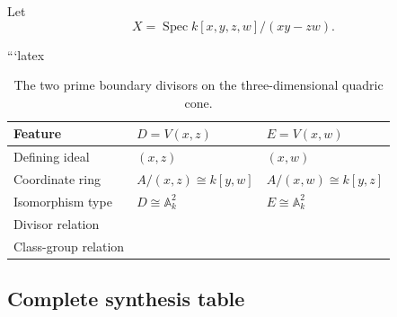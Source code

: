 \documentclass[12pt,a4paper]{article}
\DeclareMathOperator{\Spec}{Spec}
\providecommand{\Spec}{\operatorname{Spec}}
\theoremstyle{notespace}
\begin{document}
		Let
		\[
		X=\Spec k[x,y,z,w]/(xy-zw).
		\]
		
```latex
\begin{table}[htbp]
	\centering
	\renewcommand{\arraystretch}{1.45}
	\setlength{\tabcolsep}{5pt}
	\begin{tabular}{
			|>{\raggedright\arraybackslash}p{3.3cm}
			|>{\centering\arraybackslash}p{5.1cm}
			|>{\centering\arraybackslash}p{5.1cm}|
		}
		\hline
		\textbf{Feature}
		&
		\(\displaystyle D=V(x,z)\)
		&
		\(\displaystyle E=V(x,w)\)
		\\
		\hline
		
		Defining ideal
		&
		\(\displaystyle (x,z)\)
		&
		\(\displaystyle (x,w)\)
		\\
		\hline
		
		Coordinate ring
		&
		\(\displaystyle A/(x,z)\cong k[y,w]\)
		&
		\(\displaystyle A/(x,w)\cong k[y,z]\)
		\\
		\hline
		
		Isomorphism type
		&
		\(\displaystyle D\cong \mathbb{A}^{2}_{k}\)
		&
		\(\displaystyle E\cong \mathbb{A}^{2}_{k}\)
		\\
		\hline
		
		Divisor relation
		&
		\multicolumn{2}{c|}{
			\(\displaystyle \operatorname{div}(x)=D+E\)
		}
		\\
		\hline
		
		Class-group relation
		&
		\multicolumn{2}{c|}{
			\(\displaystyle [D]+[E]=0,\qquad [E]=-[D]\)
		}
		\\
		\hline
	\end{tabular}
	\caption{The two prime boundary divisors on the three-dimensional quadric cone.}
	\label{tab:three-dimensional-quadric-cone-divisors}
\end{table}

\subsection{Complete synthesis table}
\end{document}
